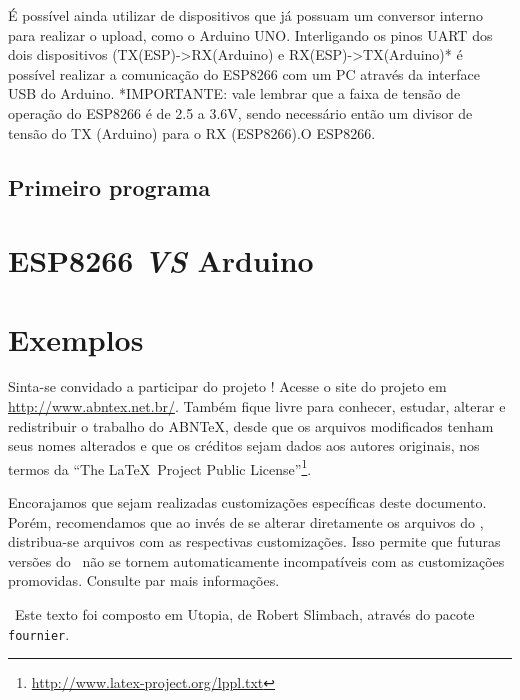 \documentclass[
	10pt,				%
	openright,			%
	twoside,			%
	a5paper,			%
	english,			%
	french,				%
	spanish,			%
	brazil,				%
	sumario=tradicional
]{abntex2}
\begin{document}
É possível ainda utilizar de dispositivos que já possuam um conversor interno para realizar o upload, como o Arduino UNO. Interligando os pinos UART dos dois dispositivos (TX(ESP)->RX(Arduino) e RX(ESP)->TX(Arduino)* é possível realizar a comunicação do ESP8266 com um PC através da interface USB do Arduino.
*IMPORTANTE: vale lembrar que a faixa de tensão de operação do ESP8266 é de 2.5 a 3.6V, sendo necessário então um divisor de tensão do TX (Arduino) para o RX (ESP8266).O ESP8266.

\section{Primeiro programa}

\chapter{ESP8266 {\normalsize{\emph{VS}}} Arduino}




\chapter{Exemplos}



\postextual %


\cleardoublepage
\thispagestyle{empty} 

Sinta-se convidado a participar do projeto \abnTeX! Acesse o site do projeto em
\url{http://www.abntex.net.br/}. Também fique livre para conhecer, estudar,
alterar e redistribuir o trabalho do ABN\TeX, desde que os arquivos modificados
tenham seus nomes alterados e que os créditos sejam dados aos autores originais,
nos termos da ``The \LaTeX\ Project Public
License''\footnote{\url{http://www.latex-project.org/lppl.txt}}.

Encorajamos que sejam realizadas customizações específicas deste documento.
Porém, recomendamos que ao invés de se alterar diretamente os arquivos do
\abnTeX, distribua-se arquivos com as respectivas customizações.
Isso permite que futuras versões do \abnTeX~não se tornem automaticamente
incompatíveis com as customizações promovidas. Consulte
 par mais informações.


~\vfill Este texto foi composto em Utopia, de Robert Slimbach, através do pacote \texttt{fournier}.
\end{document}

